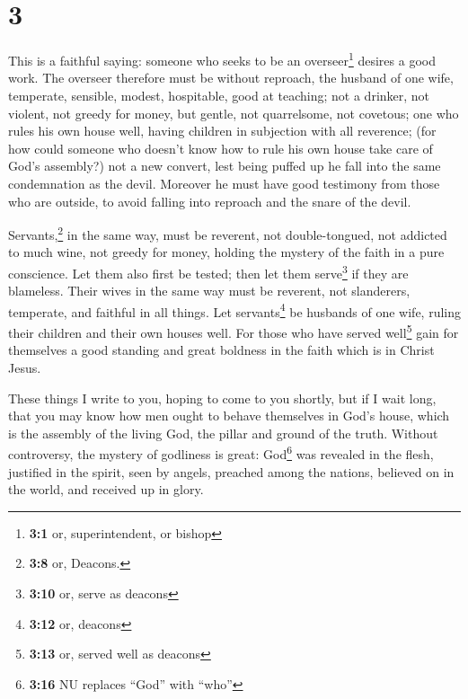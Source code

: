 \hypertarget{section-2}{%
\section{3}\label{section-2}}

 This is a faithful saying: someone who seeks to be an
overseer\footnote{\textbf{3:1} or, superintendent, or bishop} desires a
good work.  The overseer therefore must be without
reproach, the husband of one wife, temperate, sensible, modest,
hospitable, good at teaching;  not a drinker, not violent,
not greedy for money, but gentle, not quarrelsome, not covetous;
 one who rules his own house well, having children in
subjection with all reverence;  (for how could someone who
doesn't know how to rule his own house take care of God's assembly?)
 not a new convert, lest being puffed up he fall into the
same condemnation as the devil.  Moreover he must have
good testimony from those who are outside, to avoid falling into
reproach and the snare of the devil.

 Servants,\footnote{\textbf{3:8} or, Deacons.} in the same
way, must be reverent, not double-tongued, not addicted to much wine,
not greedy for money,  holding the mystery of the faith in
a pure conscience.  Let them also first be tested; then
let them serve\footnote{\textbf{3:10} or, serve as deacons} if they are
blameless.  Their wives in the same way must be reverent,
not slanderers, temperate, and faithful in all things. 
Let servants\footnote{\textbf{3:12} or, deacons} be husbands of one
wife, ruling their children and their own houses well. 
For those who have served well\footnote{\textbf{3:13} or, served well as
  deacons} gain for themselves a good standing and great boldness in the
faith which is in Christ Jesus.

 These things I write to you, hoping to come to you
shortly,  but if I wait long, that you may know how men
ought to behave themselves in God's house, which is the assembly of the
living God, the pillar and ground of the truth.  Without
controversy, the mystery of godliness is great: God\footnote{\textbf{3:16}
  NU replaces ``God'' with ``who''} was revealed in the flesh, justified
in the spirit, seen by angels, preached among the nations, believed on
in the world, and received up in glory.

